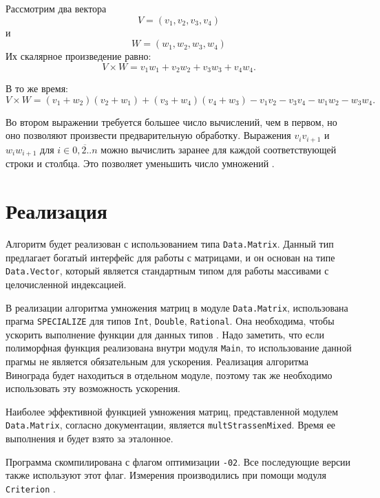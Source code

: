 \documentclass[a4paper,12pt,russian]{article}
\begin{document}
	Рассмотрим два вектора \[V = (v_1, v_2, v_3, v_4) \] и \[W = (w_1, w_2, w_3, w_4)\] Их скалярное произведение равно: \[V \times W = v_1w_1 + v_2w_2 + v_3w_3 + v_4w_4.\]
	
	В то же время: \[V \times W = (v_1 + w_2)(v_2 + w_1) + (v_3 + w_4)(v_4 + w_3) - v_1v_2 - v_3v_4 - w_1w_2 - w_3w_4.\]

	Во втором выражении требуется большее число вычислений, чем в первом, но оно позволяют произвести предварительную обработку. Выражения \(v_iv_{i+1}\) и \(w_iw_{i+1}\) для \(i\in\overline{0,2..n}\) можно вычислить заранее для каждой соответствующей строки и столбца. Это позволяет уменьшить число умножений \cite{winograd-impl}. 
	
	\section{Реализация}
	Алгоритм будет реализован с использованием типа \texttt{Data.Matrix}. Данный тип предлагает богатый интерфейс для работы с матрицами, и он основан на типе \texttt{Data.Vector}, который является стандартным типом для работы массивами с целочисленной индексацией.
	
	В реализации алгоритма умножения матриц в модуле \texttt{Data.Matrix}, использована прагма \texttt{SPECIALIZE} для типов \texttt{Int}, \texttt{Double}, \texttt{Rational}. Она необходима, чтобы ускорить выполнение функции для данных типов \cite{specialize}. Надо заметить, что если полиморфная функция реализована внутри модуля \texttt{Main}, то использование данной прагмы не является обязательным для ускорения. Реализация алгоритма Винограда будет находиться в отдельном модуле, поэтому так же необходимо использовать эту возможность ускорения.
	
	Наиболее эффективной функцией умножения матриц, представленной модулем \texttt{Data.Matrix}, согласно документации, является \texttt{multStrassenMixed}. Время ее выполнения и будет взято за эталонное.
	
	
	Программа скомпилирована с флагом оптимизации \texttt{-02}. Все последующие версии также используют этот флаг. Измерения производились при помощи модуля \texttt{Criterion} \cite{criterion}.
	
\end{document}
